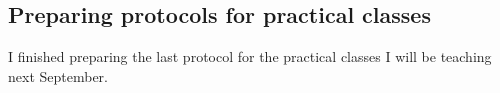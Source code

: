 \subsection{Preparing protocols for practical classes}
\label{task:20180126_cj0}

I finished preparing the last protocol for the practical classes I will be teaching next September.